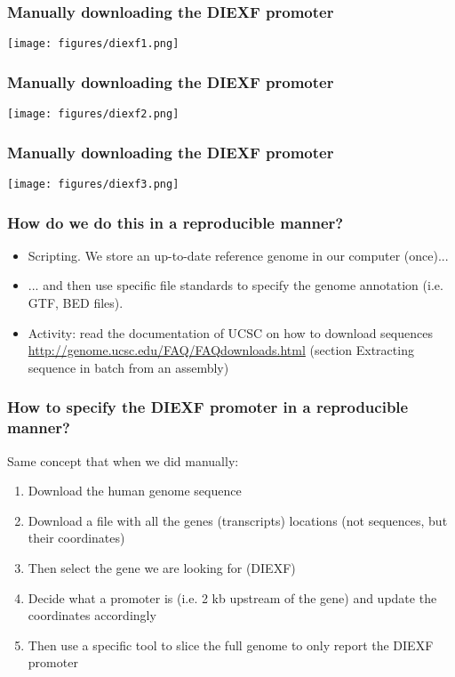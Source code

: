 \documentclass{beamer}
\begin{document}
\begin{frame}
  \frametitle{Manually downloading the DIEXF promoter}
\centering
\texttt{[image: figures/diexf1.png]}
\end{frame}


\begin{frame}
  \frametitle{Manually downloading the DIEXF promoter}
\centering
\texttt{[image: figures/diexf2.png]}
\end{frame}


\begin{frame}
  \frametitle{Manually downloading the DIEXF promoter}
\centering
\texttt{[image: figures/diexf3.png]}
\end{frame}



\begin{frame}
  \frametitle{How do we do this in a reproducible manner?}
  \begin{itemize}
  \item Scripting. We store an up-to-date reference genome in our computer (once)...
  \item ... and then use specific file standards to specify the genome annotation (i.e. GTF, BED files).
  \item Activity: read the documentation of UCSC on how to download sequences \href{http://genome.ucsc.edu/FAQ/FAQdownloads.html}{http://genome.ucsc.edu/FAQ/FAQdownloads.html} (section Extracting sequence in batch from an assembly) %
  \end{itemize}
\end{frame}

\begin{frame}
  \frametitle{How to specify the DIEXF promoter in a reproducible manner?}
  Same concept that when we did manually:
  \begin{enumerate}
  \item Download the human genome sequence
  \item Download a file with all the genes (transcripts) locations (not sequences, but their coordinates)
  \item Then select the gene we are looking for (DIEXF) 
  \item Decide what a promoter is (i.e. 2 kb upstream of the gene) and update the coordinates accordingly
  \item Then use a specific tool to slice the full genome to only report the DIEXF promoter
  \end{enumerate}
\end{frame}
\end{document}
